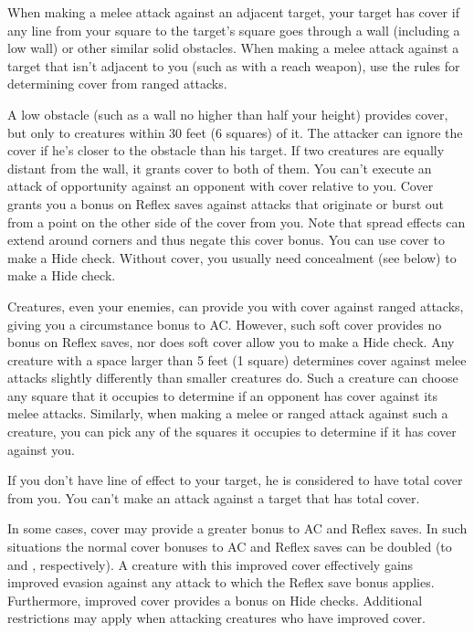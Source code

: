 When making a melee attack against an adjacent target, your target has cover if any line from your square to the target's square goes through a wall (including a low wall) or other similar solid obstacles. When making a melee attack against a target that isn't adjacent to you (such as with a reach weapon), use the rules for determining cover from ranged attacks.

 A low obstacle (such as a wall no higher than half your height) provides cover, but only to creatures within 30 feet (6 squares) of it. The attacker can ignore the cover if he's closer to the obstacle than his target. If two creatures are equally distant from the wall, it grants cover to both of them.
 You can't execute an attack of opportunity against an opponent with cover relative to you.
 Cover grants you a  bonus on Reflex saves against attacks that originate or burst out from a point on the other side of the cover from you. Note that spread effects can extend around corners and thus negate this cover bonus.
 You can use cover to make a Hide check. Without cover, you usually need concealment (see below) to make a Hide check.

 Creatures, even your enemies, can provide you with cover against ranged attacks, giving you a  circumstance bonus to AC. However, such soft cover provides no bonus on Reflex saves, nor  does soft cover allow you to make a Hide check.
 Any creature with a space larger than 5 feet (1 square) determines cover against melee attacks slightly differently than smaller creatures do. Such a creature can choose any square that it occupies to determine if an opponent has cover against its melee attacks. Similarly, when making a melee or ranged attack against such a creature, you can pick any of the squares it occupies to determine if it has cover against you.

 If you don't have line of effect to your target, he is considered to have total cover from you. You can't make an attack against a target that has total cover.

 In some cases, cover may provide a greater bonus to AC and Reflex saves. In such situations the normal cover bonuses to AC and Reflex saves can be doubled (to  and , respectively). A creature with this improved cover effectively gains improved evasion against any attack to which the Reflex save bonus applies. Furthermore, improved cover provides a  bonus on Hide checks. Additional restrictions may apply when attacking creatures who have improved cover.

